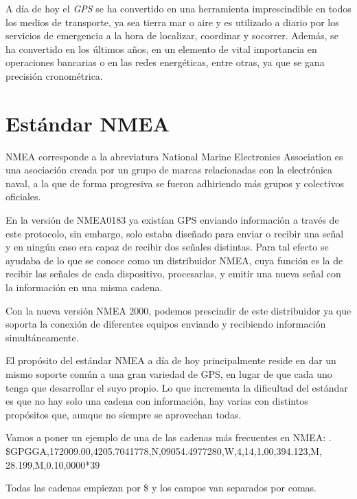 A día de hoy el \textit{GPS} se ha convertido en una herramienta imprescindible en todos los medios de transporte, ya sea tierra mar o aire y es utilizado a diario por los servicios de emergencia a la hora de localizar, coordinar y socorrer.
Además, se ha convertido en los últimos años, en un elemento de vital importancia en operaciones bancarias o en las redes energéticas, entre otras, ya que se gana precisión cronométrica.

\section{Estándar NMEA}
NMEA \cite{NMEA} corresponde a la abreviatura National Marine Electronics Association es una asociación creada por un grupo de marcas relacionadas con la electrónica naval, a la que de forma progresiva se fueron adhiriendo más grupos y colectivos oficiales. \cite{NMEA2}

En la versión de NMEA0183 ya existían GPS enviando información a través de este protocolo, sin embargo, solo estaba diseñado para enviar o recibir una señal y en ningún caso era capaz de recibir dos señales distintas. Para tal efecto se ayudaba de lo que se conoce como un distribuidor NMEA, cuya función es la de recibir las señales de cada dispositivo, procesarlas, y emitir una nueva señal con la información en una misma cadena.

Con la nueva versión NMEA 2000, podemos prescindir de este distribuidor ya que soporta la conexión de diferentes equipos enviando y recibiendo información simultáneamente.

El propósito del estándar NMEA a día de hoy principalmente reside en dar un mismo soporte común a una gran variedad de GPS, en lugar de que cada uno tenga que desarrollar el suyo propio. Lo que incrementa la dificultad del estándar es que no hay solo una cadena con información, hay varias con distintos propósitos que, aunque no siempre se aprovechan todas.

Vamos a poner un ejemplo de una de las cadenas más frecuentes en NMEA: \cite{NMEA3}.
\$GPGGA,172009.00,4205.7041778,N,09054.4977280,W,4,14,1.00,394.123,M,
28.199,M,0.10,0000*39

Todas las cadenas empiezan por \$ y los campos van separados por comas.

